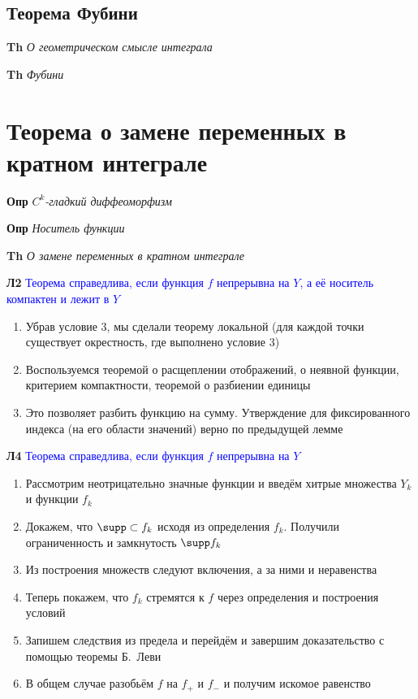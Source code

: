 \documentclass[a4paper, 14pt]{article}
\begin{document}
    \subsection{Теорема Фубини}
    
    \textbf{Th} \textit{О геометрическом смысле интеграла}
    
    \textbf{Th} \textit{Фубини}
    
    \section{Теорема о замене переменных в кратном интеграле}
    
    \textbf{Опр} \textit{$C^k$-гладкий диффеоморфизм}
    
    \textbf{Опр} \textit{Носитель функции}
    
    \textbf{Th} \textit{О замене переменных в кратном интеграле}
    
    \textbf{Л2}
    \textcolor{blue}{Теорема справедлива, если функция $f$ непрерывна на $Y$, а её носитель компактен и лежит в  $Y$}
    
    \begin{enumerate}
        \item Убрав условие 3, мы сделали теорему локальной (для каждой точки существует окрестность, где выполнено
        условие 3)
        \item Воспользуемся теоремой о расщеплении отображений, о неявной функции, критерием компактности, теоремой о
        разбиении единицы
        \item Это позволяет разбить функцию на сумму.
        Утверждение для фиксированного индекса (на его области значений) верно по предыдущей лемме
    \end{enumerate}
    
    \textbf{Л4}
    \textcolor{blue}{Теорема справедлива, если функция $f$ непрерывна на $Y$}
    
    \begin{enumerate}
        \item Рассмотрим неотрицательно значные функции и введём хитрые множества $Y_k$ и функции $f_k$
        \item Докажем, что $\supp \subset f_k$ исходя из определения $f_k$.
        Получили ограниченность и замкнутость $\supp f_k$
        \item Из построения множеств следуют включения, а за ними и неравенства
        \item Теперь покажем, что $f_k$ стремятся к $f$ через определения и построения условий
        \item Запишем следствия из предела и перейдём и завершим доказательство с помощью теоремы Б.~Леви
        \item В общем случае разобьём $f$ на $f_+$ и $f_-$ и получим искомое равенство
    \end{enumerate}
    
\end{document}
